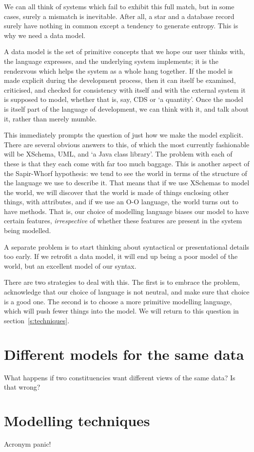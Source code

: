 \documentclass[a4paper]{article}
\begin{document}
We can all think of systems which fail to exhibit this full match, but
in some cases, surely a mismatch is inevitable.  After all, a star and
a database record surely have nothing in common except a tendency to
generate entropy.  This is why we need a data model.

A data model is the set of primitive concepts that we hope our user
thinks with, the language expresses, and the underlying system
implements; it is the rendezvous which helps the system as a whole
hang together.  If the model is made explicit during the development
process, then it can itself be examined, criticised, and checked for
consistency with itself and with the external system it is
supposed to model, whether that is, say, CDS or `a quantity'.  Once
the model is itself part of the language of development, we can think
with it, and talk about it, rather than merely mumble.

This immediately prompts the question of just how we make the model
explicit.  There are several obvious answers to this, of which the
most currently fashionable will be XSchema, UML, and `a Java
class library'.  The problem with each of these is that they each come with
far too much baggage.  This is another aspect of the Sapir-Whorf
hypothesis: we tend to see the world in terms of the
structure of the language we use to describe it.  That means that if
we use XSchemas to model the world, we will discover that the world is
made of things enclosing other things, with attributes, and if we use an O-O language,
the world turns out to have methods.  That is, our choice of modelling
language biases our model to have certain features, \emph{irrespective} of
whether these features are present in the system being modelled.

A separate problem is to start thinking about syntactical or
presentational details too early.  If we retrofit a data model, it
will end up being a poor model of the world, but an excellent
model of our syntax.

There are two strategies to deal with this.  The first is to embrace
the problem, acknowledge that our choice of language is not neutral,
and make sure that choice is a good one.  The second is to choose a
more primitive modelling language, which will push fewer things into
the model.  We will return to this question in section~\ref{s:techniques}.



\section{Different models for the same data}

What happens if two constituencies want different views of the same
data?  Is that wrong?

\section{Modelling techniques\label{s:techniques}}

Acronym panic!
\end{document}

